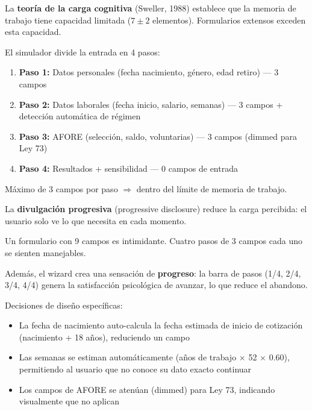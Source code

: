 \documentclass[11pt,a4paper]{report}
\begin{document}
\begin{tcolorbox}[colback=blue!5!white, colframe=blue!75!black, title=\textbf{Definici\'on Formal: Carga Cognitiva y Dise\~no de Formularios}]
La \textbf{teor\'ia de la carga cognitiva} (Sweller, 1988) establece que la memoria de trabajo tiene capacidad limitada ($7 \pm 2$ elementos). Formularios extensos exceden esta capacidad.

El simulador divide la entrada en 4 pasos:
\begin{enumerate}
  \item \textbf{Paso 1:} Datos personales (fecha nacimiento, g\'enero, edad retiro) --- 3 campos
  \item \textbf{Paso 2:} Datos laborales (fecha inicio, salario, semanas) --- 3 campos + detecci\'on autom\'atica de r\'egimen
  \item \textbf{Paso 3:} AFORE (selecci\'on, saldo, voluntarias) --- 3 campos (dimmed para Ley 73)
  \item \textbf{Paso 4:} Resultados + sensibilidad --- 0 campos de entrada
\end{enumerate}

M\'aximo de 3 campos por paso $\Rightarrow$ dentro del l\'imite de memoria de trabajo.

La \textbf{divulgaci\'on progresiva} (progressive disclosure) reduce la carga percibida: el usuario solo ve lo que necesita en cada momento.
\end{tcolorbox}

\begin{tcolorbox}[colback=green!5!white, colframe=green!50!black, title=\textbf{Intuici\'on: 4 Pasos, No 1 Formulario}]
Un formulario con 9 campos es intimidante. Cuatro pasos de 3 campos cada uno se sienten manejables.

Adem\'as, el wizard crea una sensaci\'on de \textbf{progreso}: la barra de pasos (1/4, 2/4, 3/4, 4/4) genera la satisfacci\'on psicol\'ogica de avanzar, lo que reduce el abandono.

Decisiones de dise\~no espec\'ificas:
\begin{itemize}
  \item La fecha de nacimiento auto-calcula la fecha estimada de inicio de cotizaci\'on (nacimiento + 18 a\~nos), reduciendo un campo
  \item Las semanas se estiman autom\'aticamente (a\~nos de trabajo $\times$ 52 $\times$ 0.60), permitiendo al usuario que no conoce su dato exacto continuar
  \item Los campos de AFORE se aten\'uan (dimmed) para Ley 73, indicando visualmente que no aplican
\end{itemize}
\end{tcolorbox}
\end{document}
